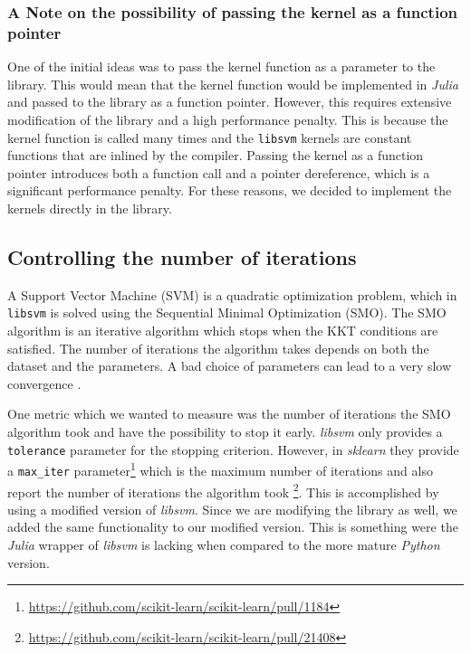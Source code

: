 \subsubsection{A Note on the possibility of passing the kernel as a function pointer}

One of the initial ideas was to pass the kernel function as a parameter to the
library. This would mean that the kernel function would be implemented in
\emph{Julia} and passed to the library as a function pointer. However, this
requires extensive modification of the library and a high performance
penalty. This is because the kernel function is called many times and the
\texttt{libsvm} kernels are constant functions that are inlined by the
compiler. Passing the kernel as a function pointer introduces both a function
call and a pointer dereference, which is a significant performance penalty. For
these reasons, we decided to implement the kernels directly in the library.

\subsection{Controlling the number of iterations}

A Support Vector Machine (SVM) is a quadratic optimization problem, which
in \texttt{libsvm} is solved using the Sequential Minimal Optimization (SMO).
The SMO algorithm is an iterative algorithm which stops when the KKT conditions
are satisfied. The number of iterations the algorithm takes depends on both
the dataset and the parameters. A bad choice of parameters can lead to a very
slow convergence \cite{CC01a}.

One metric which we wanted to measure was the number of iterations the SMO
algorithm took and have the possibility to stop it early.
\emph{libsvm} only provides a \texttt{tolerance} parameter for the stopping
criterion. However, in \emph{sklearn} they provide a \texttt{max\_iter}
parameter\footnote{\url{https://github.com/scikit-learn/scikit-learn/pull/1184}}
which is the maximum number of iterations and also report the number of
iterations the algorithm took
\footnote{\url{https://github.com/scikit-learn/scikit-learn/pull/21408}}. This
is accomplished by using a modified version of \emph{libsvm}. Since we are
modifying the library as well, we added the same functionality to our modified
version. This is something were the \emph{Julia} wrapper of \emph{libsvm} is
lacking when compared to the more mature \emph{Python} version.

\pagebreak %

